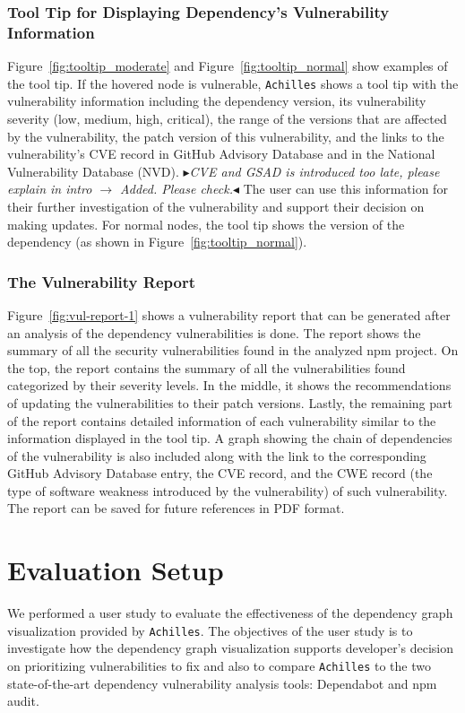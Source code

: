 \documentclass[conference]{IEEEtran}
\newcommand{\boxedtext}[1]{\fbox{\scriptsize\bfseries\textsf{#1}}}
\newcommand{\nota}[2]{
	\boxedtext{#1}
	{\small$\blacktriangleright$\emph{\textsl{#2}}$\blacktriangleleft$}
}
\newcommand{\todo}[1]{{\color{red}\nota{TODO}{#1}}}
\begin{document}
	\subsubsection{Tool Tip for Displaying Dependency's Vulnerability Information}
	Figure~\ref{fig:tooltip_moderate} and Figure~\ref{fig:tooltip_normal} show examples of the tool tip. If the hovered node is vulnerable, \texttt{Achilles} shows a tool tip with the vulnerability information including the dependency version, its vulnerability severity (low, medium, high, critical), the range of the versions that are affected by the vulnerability, the patch version of this vulnerability, and the links to the vulnerability's CVE record in GitHub Advisory Database and in the National Vulnerability Database (NVD).
	\todo{CVE and GSAD is introduced too late, please explain in intro $\rightarrow$ Added. Please check.}
	The user can use this information for their further investigation of the vulnerability and support their decision on making updates. For normal nodes, the tool tip shows the version of the dependency (as shown in Figure~\ref{fig:tooltip_normal}).
	
	\subsubsection{The Vulnerability Report}
	Figure~\ref{fig:vul-report-1} shows a vulnerability report that can be generated after an analysis of the dependency vulnerabilities is done. The report shows the summary of all the security vulnerabilities found in the analyzed npm project. On the top, the report contains the summary of all the vulnerabilities found categorized by their severity levels. 
	In the middle, it shows the recommendations of updating the vulnerabilities to their patch versions. Lastly, the remaining part of the report contains detailed information of each vulnerability similar to the information displayed in the tool tip. 
	A graph showing the chain of dependencies of the vulnerability is also included along with the link to the corresponding GitHub Advisory Database entry, the CVE record, and the CWE record (the type of software weakness introduced by the vulnerability) of such vulnerability. 
	The report can be saved for future references in PDF format.
	
	
	\section{Evaluation Setup}
	We performed a user study to evaluate the effectiveness of the dependency graph visualization provided by \texttt{Achilles}.
	The objectives of the user study is to investigate how the dependency graph visualization supports developer’s decision on prioritizing vulnerabilities to fix and also to compare \texttt{Achilles} to the two state-of-the-art dependency vulnerability analysis tools: Dependabot and npm audit. 
	
\end{document}
